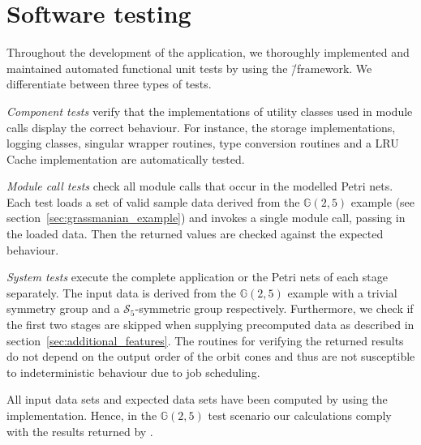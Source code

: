 \section{Software testing}

Throughout the development of the application, we thoroughly implemented and maintained automated functional unit tests by using the \gtest{}\=/framework. We differentiate between three types of tests.

\emph{Component tests} verify that the implementations of utility classes used in module calls display the correct behaviour. For instance, the storage implementations, logging classes, singular wrapper routines, type conversion routines and a LRU Cache implementation are automatically tested.

\emph{Module call tests} check all module calls that occur in the modelled Petri nets. 
Each test loads a set of valid sample data derived from the $\mathbb{G}(2,5)$ example (see section~\ref{sec:grassmanian_example}) and invokes a single module call, passing in the loaded data. Then the returned values are checked against the expected behaviour.

\emph{System tests} execute the complete application or the Petri nets of each stage separately. The input data is derived from the $\mathbb{G}(2,5)$ example with a trivial symmetry group and a $\mathcal{S}_5$-symmetric group respectively. Furthermore, we check if the first two stages are skipped when supplying precomputed data as described in section~\ref{sec:additional_features}. The routines for verifying the returned results do not depend on the output order of the orbit cones and thus are not susceptible to indeterministic behaviour due to job scheduling.

All input data sets and expected data sets have been computed by using the \gitfanlib{} implementation. Hence, in the $\mathbb{G}(2,5)$ test scenario our calculations comply with the results returned by \gitfanlib{}.
